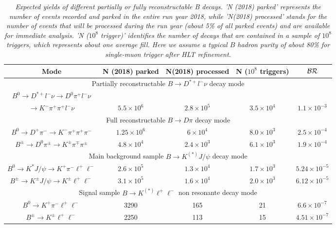 \documentclass[a4paper,11pt]{article}
\begin{document}
\begin{table}[htb]
\footnotesize\center
\caption{\it Expected yields of different partially or fully reconstructable B decays.  'N (2018) parked' represents the number of events recorded and parked in the entire run year 2018, while 'N(2018) processed' stands for the number of events that will be processed during the run year (about 5\% of all parked events) and are available for immediate analysis. 'N ($10^8 $ trigger)' identifies the number of decays that are contained in a sample of $10^8$ triggers, which represents about one average fill. Here we assume a  typical $B$ hadron purity of about 80\% for single-muon trigger after HLT refinement.  \label{tab:yields}}
\vspace{0.1in}
\begin{tabular}{ |c|c|c|c|c| }
  \hline
Mode &  N (2018) parked & N(2018) processed & N ($10^8 $ triggers) & ${\cal BR}$  \\ \hline \hline

\multicolumn{5}{|c|}{ Partially reconstructable $B \rightarrow D^{*+} l^- \nu$  decay mode}\\ \hline
$B^0\rightarrow D^{*+} l^- \nu  \rightarrow D^0 \pi^+  l^- \nu$ & \multicolumn{3}{|c|}{} &  \\ 
$\rightarrow K^- \pi^+ \pi^+ l^- \nu$ &   $5.5\times10^6$ &   $2.8\times10^5$  & $3.5\times10^4$  & $  1.1\times10^{-3}$   \\ \hline \hline

\multicolumn{5}{|c|}{ Full reconstructable $B \rightarrow D \pi$  decay mode}\\ \hline
$B^0\rightarrow D^+ \pi^-  \rightarrow K^-  \pi^+  \pi^+ \pi^-$ &  $1.25\times10^6$   &  $6\times10^4$     & $8.0\times10^3$  & $ 2.5 \times 10^{-4}$   \\ \hline
$B^{\pm} \rightarrow D^0 \pi^{\pm} \rightarrow K^{\pm}  \pi^{\mp} \pi^{\pm}$ &   $4.8\times10^4$ &  $2.4\times10^3$& $6.1\times 10^{3}$   & $1.9\times 10^{-4}$  \\ \hline \hline

\multicolumn{5}{|c|}{ Main background sample $B \rightarrow K^{(*)} J/\psi $  decay mode}\\ \hline
$B^0\rightarrow K^*J/\psi  \rightarrow K^+ \pi^- \ell^+\ell^-$ &   $2.6\times10^5$ &   $1.3\times10^4$  & $1.7 \times 10^{3}$  & $ 5.24 \times 10^{-5}$   \\ \hline
$B^{\pm}\rightarrow K^{\pm} J/\psi \rightarrow  K^{\pm} \ell^+\ell^-$ &   $3.1\times10^5$&   $1.6\times10^4$ & $2.0\times 10^{3}$ & $6.12\times 10^{-5}$   \\ \hline \hline

\multicolumn{5}{|c|}{Signal sample $B \rightarrow K^{(*)}   \ell^+\ell^-$ non resonante decay mode}\\ \hline
$B^0\rightarrow K^+ \pi^- \ell^+\ell^-$ &   3290 &   165  & 21  & $6.6 \times 10^{-7}$  \\ \hline
$B^{\pm}\rightarrow K^{\pm} \ell^+\ell^-$ &   2250 &  113  & 15  & $4.51\times 10^{-7}$  \\ \hline


  \end{tabular}
\end{table}
\end{document}
